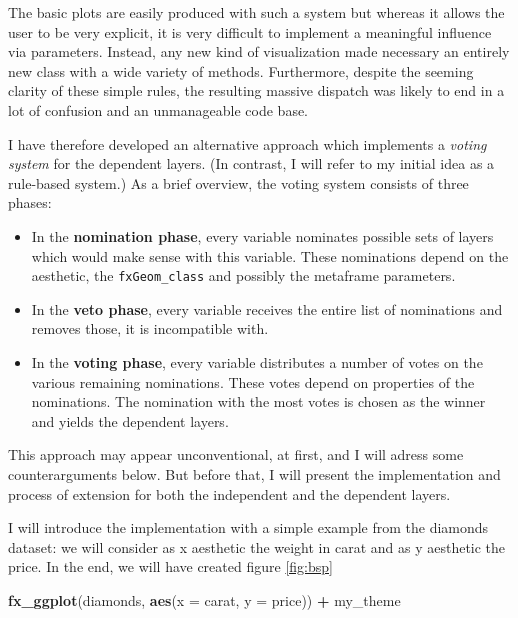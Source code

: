 \documentclass[]{report}
\newenvironment{Shaded}{\begin{snugshade}}{\end{snugshade}}
\newcommand{\KeywordTok}[1]{\textcolor[rgb]{0.13,0.29,0.53}{\textbf{#1}}}
\newcommand{\DataTypeTok}[1]{\textcolor[rgb]{0.13,0.29,0.53}{#1}}
\newcommand{\StringTok}[1]{\textcolor[rgb]{0.31,0.60,0.02}{#1}}
\newcommand{\OperatorTok}[1]{\textcolor[rgb]{0.81,0.36,0.00}{\textbf{#1}}}
\newcommand{\NormalTok}[1]{#1}
\providecommand{\tightlist}{%
  \setlength{\itemsep}{0pt}\setlength{\parskip}{0pt}}
\theoremstyle{definition}
\theoremstyle{definition}
\theoremstyle{definition}
\theoremstyle{remark}
\begin{document}
The basic plots are easily produced with such a system but whereas it
allows the user to be very explicit, it is very difficult to implement a
meaningful influence via parameters. Instead, any new kind of
visualization made necessary an entirely new class with a wide variety
of methods. Furthermore, despite the seeming clarity of these simple
rules, the resulting massive dispatch was likely to end in a lot of
confusion and an unmanageable code base.

I have therefore developed an alternative approach which implements a
\emph{voting system} for the dependent layers. (In contrast, I will
refer to my initial idea as a rule-based system.) As a brief overview,
the voting system consists of three phases:

\begin{itemize}
\tightlist
\item
  In the \textbf{nomination phase}, every variable nominates possible
  sets of layers which would make sense with this variable. These
  nominations depend on the aesthetic, the \texttt{fxGeom\_class} and
  possibly the metaframe parameters.
\item
  In the \textbf{veto phase}, every variable receives the entire list of
  nominations and removes those, it is incompatible with.
\item
  In the \textbf{voting phase}, every variable distributes a number of
  votes on the various remaining nominations. These votes depend on
  properties of the nominations. The nomination with the most votes is
  chosen as the winner and yields the dependent layers.
\end{itemize}

This approach may appear unconventional, at first, and I will adress
some counterarguments below. But before that, I will present the
implementation and process of extension for both the independent and the
dependent layers.

I will introduce the implementation with a simple example from the
diamonds dataset: we will consider as x aesthetic the weight in carat
and as y aesthetic the price. In the end, we will have created figure
\ref{fig:bsp}

\begin{Shaded}
\begin{Highlighting}[]
\KeywordTok{fx_ggplot}\NormalTok{(diamonds, }\KeywordTok{aes}\NormalTok{(}\DataTypeTok{x =}\NormalTok{ carat, }\DataTypeTok{y =}\NormalTok{ price)) }\OperatorTok{+}\StringTok{ }
\StringTok{  }\NormalTok{my_theme}
\end{Highlighting}
\end{Shaded}
\end{document}
